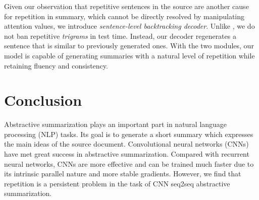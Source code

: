\documentclass{nle}
\theoremstyle{definition}
\begin{document}
Given our observation that repetitive sentences in the source are
another cause for repetition in summary, 
which cannot be directly resolved by manipulating attention values, 
we introduce \textit{sentence-level backtracking decoder}. 
Unlike \cite{PaulusXS17}, 
we do not ban repetitive \textit{trigrams} in test time. 
Instead, our decoder regenerates a sentence that is similar to previously generated ones.
With the two modules, our model is capable of generating summaries with a
natural level of repetition while retaining fluency and consistency.

\section{Conclusion}
\label{sec:conclude}
Abstractive summarization plays an important part in natural 
language processing (NLP) tasks.
Its goal is to generate a short summary which expresses the main ideas 
of the source document.
Convolutional neural networks (CNNs) have
met great success in abstractive summarization.
Compared with recurrent neural networks, 
CNNs are more effective and can be trained much faster due to 
its intrinsic parallel nature and more stable gradients.
However, we find that repetition is a persistent problem in the task of CNN seq2seq abstractive summarization. 
\end{document}
